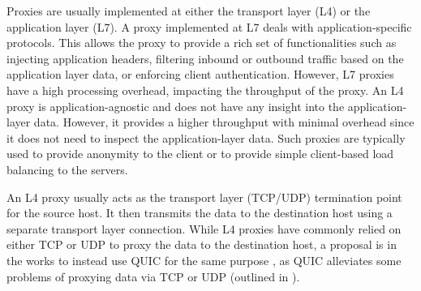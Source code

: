 Proxies are usually implemented at either the transport layer (L4) or the application layer (L7).
A proxy implemented at L7 deals with application-specific protocols.
This allows the proxy to provide a rich set of functionalities such as injecting application headers, filtering inbound or outbound traffic based on the application layer data, or enforcing client authentication.
However, L7 proxies have a high processing overhead, impacting the throughput of the proxy.
An L4 proxy is application-agnostic and does not have any insight into the application-layer data.
However, it provides a higher throughput with minimal overhead since it does not need to inspect the application-layer data.
Such proxies are typically used to provide anonymity to the client or to provide simple client-based load balancing to the servers.

An L4 proxy usually acts as the transport layer (TCP/UDP) termination point for the source host.
It then transmits the data to the destination host using a separate transport layer connection.
While L4 proxies have commonly relied on either TCP or UDP to proxy the data to the destination host, a proposal is in the works to instead use QUIC for the same purpose \cite{quic_masque}, as QUIC alleviates some problems of proxying data via TCP or UDP (outlined in ).
